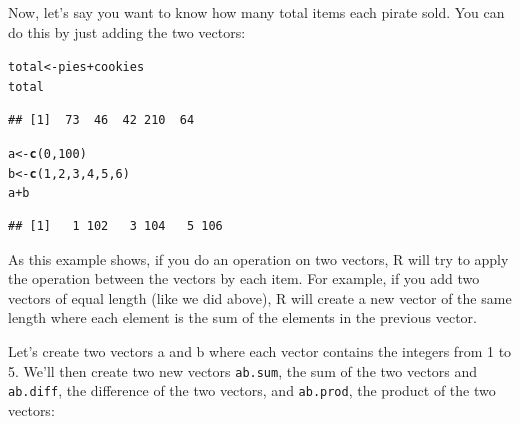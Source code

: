 \documentclass{tufte-book}\usepackage[]{graphicx}\usepackage[]{color}
\makeatletter
\newcommand{\hlnum}[1]{\textcolor[rgb]{0.686,0.059,0.569}{#1}}%
\newcommand{\hlopt}[1]{\textcolor[rgb]{0,0,0}{#1}}%
\newcommand{\hlstd}[1]{\textcolor[rgb]{0.345,0.345,0.345}{#1}}%
\newcommand{\hlkwb}[1]{\textcolor[rgb]{0.69,0.353,0.396}{#1}}%
\newcommand{\hlkwd}[1]{\textcolor[rgb]{0.737,0.353,0.396}{\textbf{#1}}}%
\newenvironment{kframe}{%
 \def\at@end@of@kframe{}%
 \ifinner\ifhmode%
  \def\at@end@of@kframe{\end{minipage}}%
  \begin{minipage}{\columnwidth}%
 \fi\fi%
 \def\FrameCommand##1{\hskip\@totalleftmargin \hskip-\fboxsep
 \colorbox{shadecolor}{##1}\hskip-\fboxsep
     \hskip-\linewidth \hskip-\@totalleftmargin \hskip\columnwidth}%
 \MakeFramed {\advance\hsize-\width
   \@totalleftmargin\z@ \linewidth\hsize
   \@setminipage}}%
 {\par\unskip\endMakeFramed%
 \at@end@of@kframe}
\newenvironment{knitrout}{}{} %
\makeatother
\begin{document}
Now, let's say you want to know how many total items each pirate sold. You can do this by just adding the two vectors:

\begin{knitrout}
\color{fgcolor}\begin{kframe}
\begin{alltt}
\hlstd{total} \hlkwb{<-} \hlstd{pies} \hlopt{+} \hlstd{cookies}
\hlstd{total}
\end{alltt}
\begin{verbatim}
## [1]  73  46  42 210  64
\end{verbatim}
\end{kframe}
\end{knitrout}



\begin{marginfigure}

\begin{knitrout}
\color{fgcolor}\begin{kframe}
\begin{alltt}
\hlstd{a} \hlkwb{<-} \hlkwd{c}\hlstd{(}\hlnum{0}\hlstd{,} \hlnum{100}\hlstd{)}
\hlstd{b} \hlkwb{<-} \hlkwd{c}\hlstd{(}\hlnum{1}\hlstd{,} \hlnum{2}\hlstd{,} \hlnum{3}\hlstd{,} \hlnum{4}\hlstd{,} \hlnum{5}\hlstd{,} \hlnum{6}\hlstd{)}
\hlstd{a} \hlopt{+} \hlstd{b}
\end{alltt}
\begin{verbatim}
## [1]   1 102   3 104   5 106
\end{verbatim}
\end{kframe}
\end{knitrout}

\end{marginfigure}

As this example shows, if you do an operation on two vectors, R will try to apply the operation between the vectors by each item. For example, if you add two vectors of equal length (like we did above), R will create a new vector of the same length where each element is the sum of the elements in the previous vector.

Let's create two vectors a and b where each vector contains the integers from 1 to 5. We'll then create two new vectors \texttt{ab.sum}, the sum of the two vectors and \texttt{ab.diff}, the difference of the two vectors, and \texttt{ab.prod}, the product of the two vectors:
\end{document}
